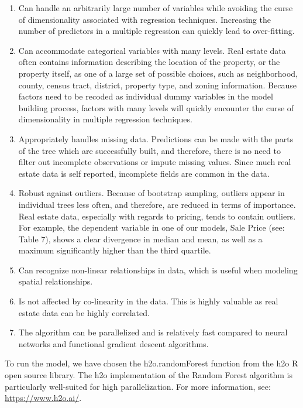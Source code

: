 \documentclass[12pt,]{article}
\providecommand{\tightlist}{%
  \setlength{\itemsep}{0pt}\setlength{\parskip}{0pt}}
\begin{document}
\begin{enumerate}
\def\labelenumi{\arabic{enumi}.}
\tightlist
\item
  Can handle an arbitrarily large number of variables while avoiding the
  curse of dimensionality associated with regression techniques.
  Increasing the number of predictors in a multiple regression can
  quickly lead to over-fitting.
\item
  Can accommodate categorical variables with many levels. Real estate
  data often contains information describing the location of the
  property, or the property itself, as one of a large set of possible
  choices, such as neighborhood, county, census tract, district,
  property type, and zoning information. Because factors need to be
  recoded as individual dummy variables in the model building process,
  factors with many levels will quickly encounter the curse of
  dimensionality in multiple regression techniques.
\item
  Appropriately handles missing data. Predictions can be made with the
  parts of the tree which are successfully built, and therefore, there
  is no need to filter out incomplete observations or impute missing
  values. Since much real estate data is self reported, incomplete
  fields are common in the data.
\item
  Robust against outliers. Because of bootstrap sampling, outliers
  appear in individual trees less often, and therefore, are reduced in
  terms of importance. Real estate data, especially with regards to
  pricing, tends to contain outliers. For example, the dependent
  variable in one of our models, Sale Price (see: Table 7), shows a
  clear divergence in median and mean, as well as a maximum
  significantly higher than the third quartile.
\item
  Can recognize non-linear relationships in data, which is useful when
  modeling spatial relationships.
\item
  Is not affected by co-linearity in the data. This is highly valuable
  as real estate data can be highly correlated.
\item
  The algorithm can be parallelized and is relatively fast compared to
  neural networks and functional gradient descent algorithms.
\end{enumerate}

To run the model, we have chosen the h2o.randomForest function from the
h2o R open source library. The h2o implementation of the Random Forest
algorithm is particularly well-suited for high parallelization. For more
information, see: \url{https://www.h2o.ai/}.
\end{document}
